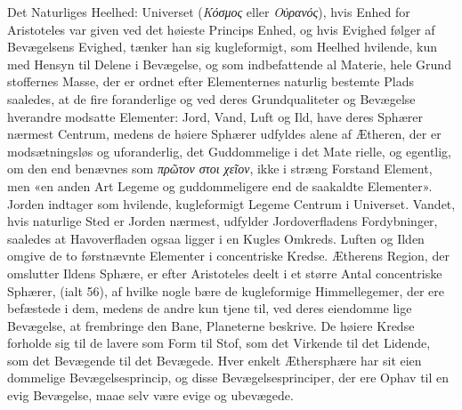 \documentclass[12pt,a4paper]{book}
\newcommand{\gk}[1]{\textit{#1}}
\begin{document}
Det Naturliges Heelhed: Universet (\gk{Κόσμος} eller \gk{Οὐρανός}),
hvis Enhed for Aristoteles var given ved det høieste Princips
Enhed, og hvis Evighed følger af Bevægelsens Evighed, tænker
han sig kugleformigt, som Heelhed hvilende, kun med Hensyn til
Delene i Bevægelse, og som indbefattende al Materie, hele Grund\-%
stoffernes Masse, der er ordnet efter Elementernes naturlig
bestemte Plads saaledes, at de fire foranderlige og ved deres
Grundqualiteter og Bevægelse hverandre modsatte Elementer:
Jord, Vand, Luft og Ild, have deres Sphærer nærmest Centrum,
medens de høiere Sphærer udfyldes alene af Ætheren, der er
modsætningsløs og uforanderlig, det Guddommelige i det Mate\-%
rielle, og egentlig, om den end benævnes som \gk{πρῶτον στοι\-%
χεῖον}, ikke i stræng Forstand Element, men «en anden Art
Legeme og guddommeligere end de saakaldte Elementer».
Jorden indtager som hvilende, kugleformigt Legeme Centrum
i Universet. Vandet, hvis naturlige Sted er Jorden nærmest,
udfylder Jordoverfladens Fordybninger, saaledes at Havoverfladen
ogsaa ligger i en Kugles Omkreds. Luften og Ilden omgive
de to førstnævnte Elementer i concentriske Kredse. Ætherens
Region, der omslutter Ildens Sphære, er efter Aristoteles deelt
i et større Antal concentriske Sphærer, (ialt 56), af hvilke
nogle bære de kugleformige Himmellegemer, der ere befæstede
i dem, medens de andre kun tjene til, ved deres eiendomme\-%
lige Bevægelse, at frembringe den Bane, Planeterne beskrive.
De høiere Kredse forholde sig til de lavere som Form til
Stof, som det Virkende til det Lidende, som det Bevægende
til det Bevægede. Hver enkelt Æthersphære har sit eien\-%
dommelige Bevægelsesprincip, og disse Bevægelsesprinciper, der
ere Ophav til en evig Bevægelse, maae selv være evige og
ubevægede.
\end{document}
